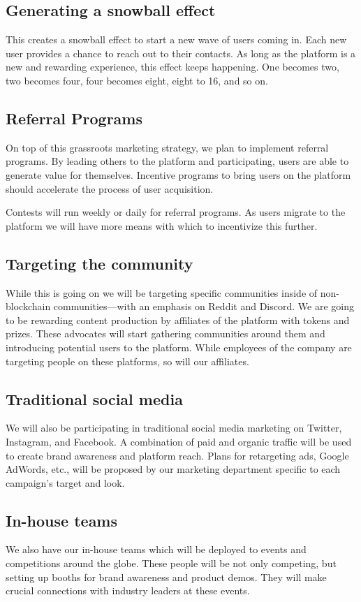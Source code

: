 \documentclass[11pt]{report}
\begin{document}
\subsection{Generating a snowball effect}
This creates a snowball effect to start a new wave of users coming in. Each new user provides a chance to reach out to their contacts. As long as the platform is a new and rewarding experience, this effect keeps happening. One becomes two, two becomes four, four becomes eight, eight to 16, and so on. 
\subsection{Referral Programs}
On top of this grassroots marketing strategy, we plan to implement referral programs. By leading others to the platform and participating, users are able to generate value for themselves. Incentive programs to bring users on the platform should accelerate the process of user acquisition.

Contests will run weekly or daily for referral programs. As users migrate to the platform we will have more means with which to incentivize this further.
\subsection{Targeting the community}
While this is going on we will be targeting specific communities inside of non-blockchain communities---with an emphasis on Reddit and Discord. We are going to be rewarding content production by affiliates of the platform with tokens and prizes. These advocates will start gathering communities around them and introducing potential users to the platform. While employees of the company are targeting people on these platforms, so will our affiliates.
\subsection{Traditional social media}
We will also be participating in traditional social media marketing on Twitter, Instagram, and Facebook. A combination of paid and organic traffic will be used to create brand awareness and platform reach. Plans for retargeting ads, Google AdWords, etc., will be proposed by our marketing department specific to each campaign's target and look.
\subsection{In-house teams}
We also have our in-house teams which will be deployed to events and competitions around the globe. These people will be not only competing, but setting up booths for brand awareness and product demos. They will make crucial connections with industry leaders at these events.
\end{document}
